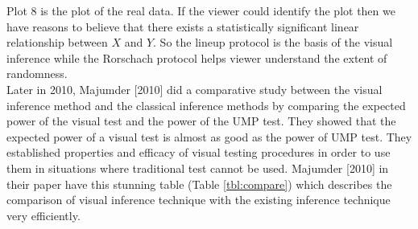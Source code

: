 \documentclass[12]{report}
\begin{document}
Plot 8 is the plot of the real data. If the viewer could identify the plot then we have reasons to believe that there exists a statistically significant linear relationship between $X$ and $Y$. So the lineup protocol is the basis of the visual inference while the Rorschach protocol helps viewer understand the extent of randomness. \\

Later in 2010, Majumder [2010] did a comparative study between the visual inference method and the classical inference methods by comparing the expected power of the visual test and the power of the UMP test. They showed that the expected power of a visual test is almost as good as the power of UMP test. They established properties and efficacy of visual testing procedures in order to use them in situations where traditional test cannot be used. Majumder [2010] in their paper have this stunning table (Table \ref{tbl:compare}) which describes the comparison of visual inference technique with the existing inference technique very efficiently. 

\newpage
\end{document}

